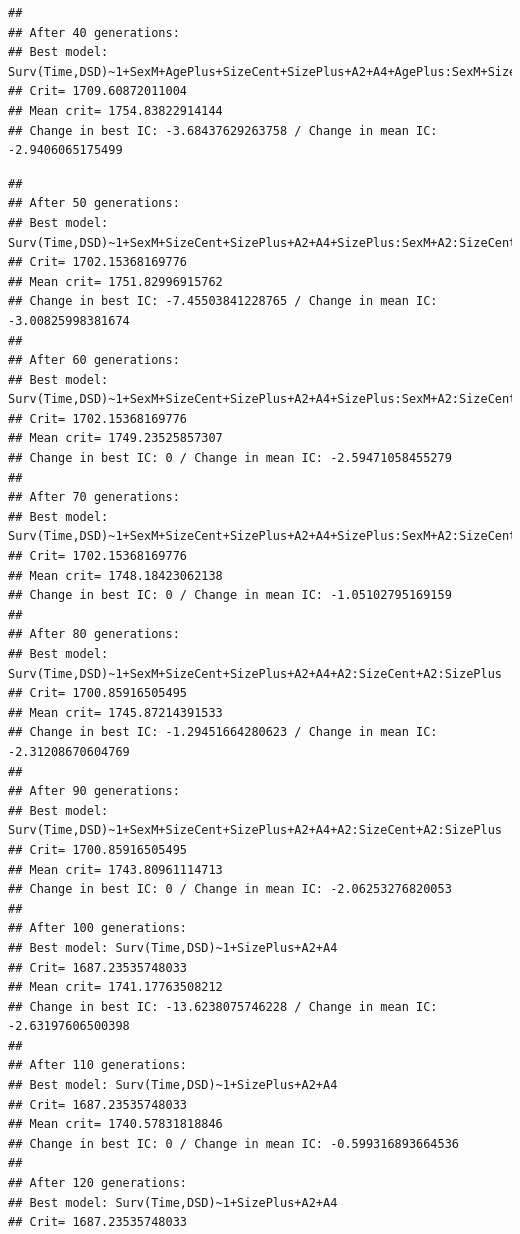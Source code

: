 \documentclass{article}\usepackage[]{graphicx}\usepackage[]{color}
\makeatletter
\newenvironment{kframe}{%
 \def\at@end@of@kframe{}%
 \ifinner\ifhmode%
  \def\at@end@of@kframe{\end{minipage}}%
  \begin{minipage}{\columnwidth}%
 \fi\fi%
 \def\FrameCommand##1{\hskip\@totalleftmargin \hskip-\fboxsep
 \colorbox{shadecolor}{##1}\hskip-\fboxsep
     \hskip-\linewidth \hskip-\@totalleftmargin \hskip\columnwidth}%
 \MakeFramed {\advance\hsize-\width
   \@totalleftmargin\z@ \linewidth\hsize
   \@setminipage}}%
 {\par\unskip\endMakeFramed%
 \at@end@of@kframe}
\newenvironment{knitrout}{}{} %
\makeatother
\begin{document}
\begin{knitrout}
\begin{kframe}
{\ttfamily\noindent\color{warningcolor}{\#\# Warning in fitter(X, Y, strats, offset, init, control, weights = weights, : Loglik converged before variable\ \ 4 ; beta may be infinite.}}\begin{verbatim}
## 
## After 40 generations:
## Best model: Surv(Time,DSD)~1+SexM+AgePlus+SizeCent+SizePlus+A2+A4+AgePlus:SexM+SizePlus:SexM+A2:SizeCent+A2:SizePlus
## Crit= 1709.60872011004
## Mean crit= 1754.83822914144
## Change in best IC: -3.68437629263758 / Change in mean IC: -2.9406065175499
\end{verbatim}


{\ttfamily\noindent\color{warningcolor}{\#\# Warning in fitter(X, Y, strats, offset, init, control, weights = weights, : Loglik converged before variable\ \ 3 ; beta may be infinite.}}\begin{verbatim}
## 
## After 50 generations:
## Best model: Surv(Time,DSD)~1+SexM+SizeCent+SizePlus+A2+A4+SizePlus:SexM+A2:SizeCent+A2:SizePlus
## Crit= 1702.15368169776
## Mean crit= 1751.82996915762
## Change in best IC: -7.45503841228765 / Change in mean IC: -3.00825998381674
## 
## After 60 generations:
## Best model: Surv(Time,DSD)~1+SexM+SizeCent+SizePlus+A2+A4+SizePlus:SexM+A2:SizeCent+A2:SizePlus
## Crit= 1702.15368169776
## Mean crit= 1749.23525857307
## Change in best IC: 0 / Change in mean IC: -2.59471058455279
## 
## After 70 generations:
## Best model: Surv(Time,DSD)~1+SexM+SizeCent+SizePlus+A2+A4+SizePlus:SexM+A2:SizeCent+A2:SizePlus
## Crit= 1702.15368169776
## Mean crit= 1748.18423062138
## Change in best IC: 0 / Change in mean IC: -1.05102795169159
## 
## After 80 generations:
## Best model: Surv(Time,DSD)~1+SexM+SizeCent+SizePlus+A2+A4+A2:SizeCent+A2:SizePlus
## Crit= 1700.85916505495
## Mean crit= 1745.87214391533
## Change in best IC: -1.29451664280623 / Change in mean IC: -2.31208670604769
## 
## After 90 generations:
## Best model: Surv(Time,DSD)~1+SexM+SizeCent+SizePlus+A2+A4+A2:SizeCent+A2:SizePlus
## Crit= 1700.85916505495
## Mean crit= 1743.80961114713
## Change in best IC: 0 / Change in mean IC: -2.06253276820053
## 
## After 100 generations:
## Best model: Surv(Time,DSD)~1+SizePlus+A2+A4
## Crit= 1687.23535748033
## Mean crit= 1741.17763508212
## Change in best IC: -13.6238075746228 / Change in mean IC: -2.63197606500398
## 
## After 110 generations:
## Best model: Surv(Time,DSD)~1+SizePlus+A2+A4
## Crit= 1687.23535748033
## Mean crit= 1740.57831818846
## Change in best IC: 0 / Change in mean IC: -0.599316893664536
## 
## After 120 generations:
## Best model: Surv(Time,DSD)~1+SizePlus+A2+A4
## Crit= 1687.23535748033

\end{verbatim}
\end{kframe}
\end{knitrout}
\end{document}
